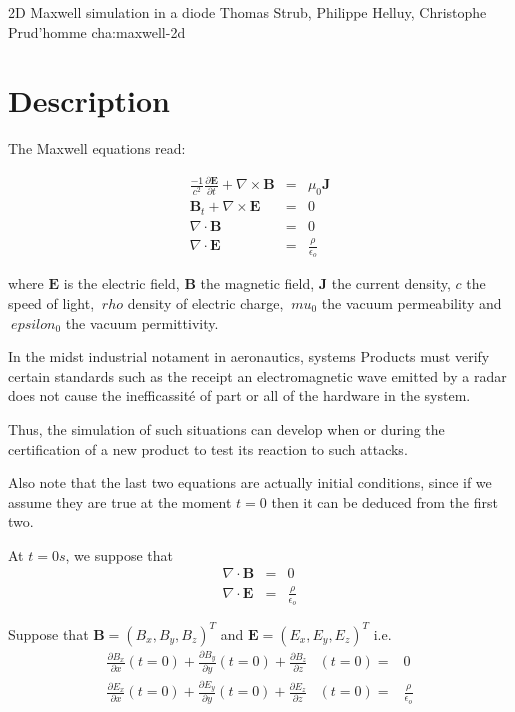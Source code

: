             {2D Maxwell simulation in a diode}
            {Thomas Strub, Philippe Helluy, Christophe Prud'homme}
            {cha:maxwell-2d}
\newcommand{\E}{\ensuremath{{\bm E}}\xspace}
\newcommand{\B}{\ensuremath{{\bm B}}\xspace}
\newcommand{\J}{\ensuremath{{\bm J}}\xspace}
\section{Description}
\label{sec:description}

The Maxwell equations read:


\begin{eqnarray*}
\frac{-1}{c^{2}}\frac{\partial \E}{\partial t}+\nabla\times \B & = & \mu_{0} \J\\
\B_{t}+\nabla\times \E & = & 0\\
\nabla \cdot \B & = & 0\\
\nabla \cdot \E & = & \frac{\rho}{\epsilon_{o}}
\end{eqnarray*}

where \E is the electric field, \B the magnetic field,
\J the current density, $ c $ the speed of light, $ \ rho $
density of electric charge, $ \ mu_ {0} $ the vacuum permeability
and $ \ epsilon_ {0} $ the vacuum permittivity.

In the midst industrial notament in aeronautics, systems
Products must verify certain standards such as the receipt
an electromagnetic wave emitted by a radar does not cause
the inefficassité of part or all of the hardware in the
system.

Thus, the simulation of such situations can develop when
or during the certification of a new product to test its reaction
to such attacks.

Also note that the last two equations are actually
initial conditions, since if we assume they are true at the moment
$ t = 0$ then it can be deduced from the first two.

At $t=0s$, we suppose that
\begin{eqnarray}
\nabla \cdot \B & = & 0\\
\nabla \cdot \E & = & \frac{\rho}{\epsilon_{o}}
\end{eqnarray}

Suppose that $\B = (B_x, B_y, B_z )^T$ and $\E=(E_x,E_y,E_z)^T$
i.e.\begin{eqnarray}
\frac{\partial B_{x}}{\partial x}(t=0)+\frac{\partial B_{y}}{\partial y}(t=0)+\frac{\partial B_{z}}{\partial z} & (t=0)= & 0\\
\frac{\partial E_{x}}{\partial x}(t=0)+\frac{\partial E_{y}}{\partial
y}(t=0)+\frac{\partial E_{z}}{\partial z} & (t=0)= & \frac{\rho}{\epsilon_{o}}
\end{eqnarray}


